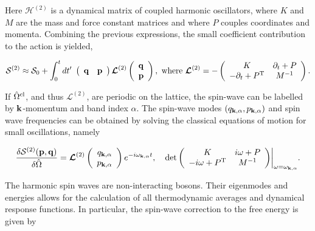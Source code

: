 \documentclass{homework}
\begin{document}
Here $\bm{\mathcal{H}}^{(2)}$ is a dynamical matrix of coupled harmonic oscillators, where $K$ and $M$ are the mass and force constant matrices and where $P$ couples coordinates and momenta. Combining the previous expressions, the small coefficient contribution to the action is yielded,

\begin{equation}
    \mathcal{S}^{(2)} \approx \mathcal{S}_0 + \int_{0}^t dt' \textnormal{ } \left(\begin{array}{cc}
          {\bf q} & {\bf p}
    \end{array}\right) \bm{\mathcal{L}}^{(2)} \left( \begin{array}{c}
          {\bf q} \\
          {\bf p}
    \end{array}\right), \textnormal{ where } \bm{\mathcal{L}}^{(2)} = - \left(\begin{array}{cc}
        K & \partial_{t} + P \\
        - \partial_{t} + P^{\textnormal{T}} & M^{-1} 
    \end{array}\right).
\end{equation}

If $\hat{\Omega}^{\textnormal{cl}}$, and thus $\bm{\mathcal{L}}^{(2)}$, are periodic on the lattice, the spin-wave can be labelled by ${\bf k}$-momentum and band index $\alpha$. 
The spin-wave modes $(q_{{\bf k}, \alpha}, p_{{\bf k}, \alpha})$ and spin wave frequencies can be obtained by solving the classical equations of motion for small oscillations, namely 

\begin{equation}
\begin{split}
     \frac{\delta \mathcal{S}^{(2)} ({\bf p}, {\bf q})}{\delta \hat{\Omega}} = \bm{\mathcal{L}}^{(2)}  \left(\begin{array}{c}
         q_{{\bf k}, \alpha}  \\
         p_{{\bf k}, \alpha} 
    \end{array}\right) e^{-i \omega_{{\bf k}, \alpha} t}, \quad 
    \det \bigg(\begin{array}{cc}
        K & i\omega + P  \\
        -i\omega + P^{\textnormal{T}} & M^{-1} 
    \end{array}\bigg)\bigg|_{\omega = \omega_{{\bf k}, \alpha}}.
\end{split}
\end{equation}

The harmonic spin waves are non-interacting bosons. Their eigenmodes and energies allows for the calculation of all thermodynamic averages and dynamical response functions. In particular, the spin-wave correction to the free energy is given by 
\end{document}
